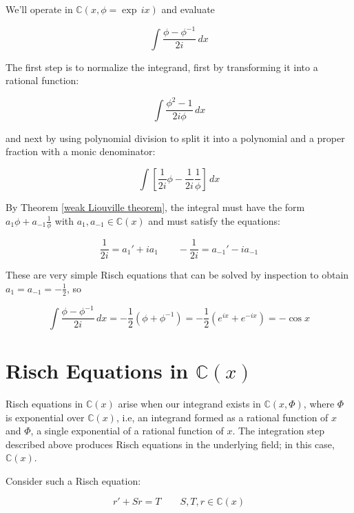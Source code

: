 We'll operate in ${\mathbb C}(x, \phi = \exp \,ix)$ and evaluate

$$\int \frac{\phi - \phi^{-1}}{2i} \,dx$$

The first step is to normalize the integrand, first by transforming it
into a rational function:

$$\int \frac{\phi^2 - 1}{2i \phi} \,dx $$

and next by using polynomial division to split it into a polynomial
and a proper fraction with a monic denominator:

$$\int \left[ \frac{1}{2i} \phi - \frac{1}{2i} \frac{1}{\phi} \right] \,dx $$

By Theorem \ref{weak Liouville theorem}, the integral must have the
form $a_1 \phi + a_{-1} \frac{1}{\phi}$ with $a_1, a_{-1} \in {\mathbb
C}(x)$ and must satisfy the equations:

$$\frac{1}{2i} = a_1' + i a_1 \qquad - \frac{1}{2i} = a_{-1}' - i a_{-1}$$ 

These are very simple Risch equations that can be solved by inspection
to obtain $a_1 = a_{-1} = -\frac{1}{2}$, so

$$\int \frac{\phi - \phi^{-1}}{2i} \,dx = -\frac{1}{2}(\phi + \phi^{-1})
 = -\frac{1}{2}(e^{ix} + e^{-ix}) = -\cos x$$

\endexample

\vfill\eject
\section{Risch Equations in ${\mathbb C}(x)$}

Risch equations in ${\mathbb C}(x)$ arise when our integrand exists in
${\mathbb C}(x,\Phi)$, where $\Phi$ is exponential over ${\mathbb
C}(x)$, i.e, an integrand formed as a rational function of $x$ and $\Phi$, a
single exponential of a rational function of $x$.  The integration step
described above produces Risch equations in the underlying field;
in this case, ${\mathbb C}(x)$.

Consider such a Risch equation:

$$r' + S r = T \qquad S,T,r \in {\mathbb C}(x)$$

\begin{comment}
Recall that in ${\mathbb C}(x)$, irreducible factors in the
denominator always increase in degree on differentiation, so $A$'s
factors are the only factors that can appears in $q$'s denominator,
because they must cancel against $q'$.  Thus, we can easily identify
which irreducible factors can appear in $q$'s denominator, and we next
wish to calculate the multiplicities with which they appear.
\end{comment}

